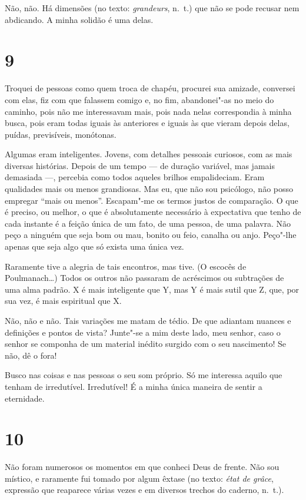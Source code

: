Não, não. Há dimensões (no texto: \emph{grandeurs}, n.~t.) que não se
pode recusar nem abdicando. A minha solidão é uma delas.

\section{9}

Troquei de pessoas como quem troca de chapéu, procurei sua amizade,
conversei com elas, fiz com que falassem comigo e, no fim, abandonei"-as
no meio do caminho, pois não me interessavam mais, pois nada nelas
correspondia à minha busca, pois eram todas iguais às anteriores e
iguais às que vieram depois delas, puídas, previsíveis, monótonas.

Algumas eram inteligentes. Jovens, com detalhes pessoais curiosos, com
as mais diversas histórias. Depois de um tempo --- de duração variável,
mas jamais demasiada \mbox{---,} percebia como todos aqueles brilhos
empalideciam. Eram qualidades mais ou menos grandiosas. Mas eu, que não
sou psicólogo, não posso empregar ``mais ou menos''. Escapam"-me os
termos justos de comparação. O que é preciso, ou melhor, o que é
absolutamente necessário à expectativa que tenho de cada instante é a
feição única de um fato, de uma pessoa, de uma palavra. Não peço a
ninguém que seja bom ou mau, bonito ou feio, canalha ou anjo. Peço"-lhe
apenas que seja algo que só exista uma única vez.

Raramente tive a alegria de tais encontros, mas tive. (O escocês de
Poulmanach\ldots{}) Todos os outros não passaram de acréscimos ou
subtrações de uma alma padrão. X é mais inteligente que Y, mas Y é mais
sutil que Z, que, por sua vez, é mais espiritual que X.

Não, não e não. Tais variações me matam de tédio. De que adiantam
nuances e definições e pontos de vista? Junte"-se a mim deste lado, meu
senhor, caso o senhor se componha de um material inédito surgido com o
seu nascimento! Se não, dê o fora!

Busco nas coisas e nas pessoas o seu som próprio. Só me interessa aquilo
que tenham de irredutível. Irredutível! É a minha única maneira de
sentir a eternidade.

\section{10}

Não foram numerosos os momentos em que conheci Deus de frente. Não sou
místico, e raramente fui tomado por algum êxtase (no texto: \emph{état
de grâce}, expressão que reaparece várias vezes e em diversos trechos do
caderno, n.~t.).

